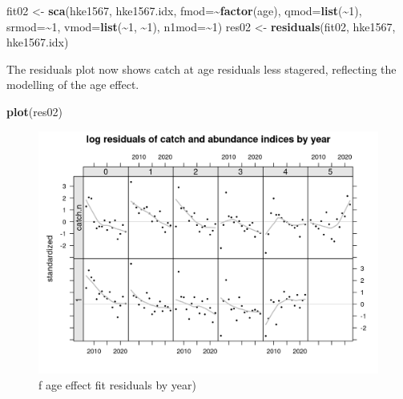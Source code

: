 \documentclass[
]{book}
\newenvironment{Shaded}{\begin{snugshade}}{\end{snugshade}}
\newcommand{\AttributeTok}[1]{\textcolor[rgb]{0.13,0.29,0.53}{#1}}
\newcommand{\DecValTok}[1]{\textcolor[rgb]{0.00,0.00,0.81}{#1}}
\newcommand{\FunctionTok}[1]{\textcolor[rgb]{0.13,0.29,0.53}{\textbf{#1}}}
\newcommand{\NormalTok}[1]{#1}
\newcommand{\OtherTok}[1]{\textcolor[rgb]{0.56,0.35,0.01}{#1}}
\newcommand{\SpecialCharTok}[1]{\textcolor[rgb]{0.81,0.36,0.00}{\textbf{#1}}}
\begin{document}
\begin{Shaded}
\begin{Highlighting}[]
\NormalTok{fit02 }\OtherTok{\textless{}{-}} \FunctionTok{sca}\NormalTok{(hke1567, hke1567.idx, }\AttributeTok{fmod=}\SpecialCharTok{\textasciitilde{}}\FunctionTok{factor}\NormalTok{(age), }\AttributeTok{qmod=}\FunctionTok{list}\NormalTok{(}\SpecialCharTok{\textasciitilde{}}\DecValTok{1}\NormalTok{), }\AttributeTok{srmod=}\SpecialCharTok{\textasciitilde{}}\DecValTok{1}\NormalTok{, }\AttributeTok{vmod=}\FunctionTok{list}\NormalTok{(}\SpecialCharTok{\textasciitilde{}}\DecValTok{1}\NormalTok{, }\SpecialCharTok{\textasciitilde{}}\DecValTok{1}\NormalTok{),  }\AttributeTok{n1mod=}\SpecialCharTok{\textasciitilde{}}\DecValTok{1}\NormalTok{)}
\NormalTok{res02 }\OtherTok{\textless{}{-}} \FunctionTok{residuals}\NormalTok{(fit02, hke1567, hke1567.idx)}
\end{Highlighting}
\end{Shaded}

The residuals plot now shows catch at age residuals less stagered, reflecting the modelling of the age effect.

\begin{Shaded}
\begin{Highlighting}[]
\FunctionTok{plot}\NormalTok{(res02)}
\end{Highlighting}
\end{Shaded}

\begin{figure}
\centering
\includegraphics{_bookdown_files/_main_files/figure-html/fageresbyyear-1.png}
\caption{\label{fig:fageresbyyear}f age effect fit residuals by year)}
\end{figure}
\end{document}
